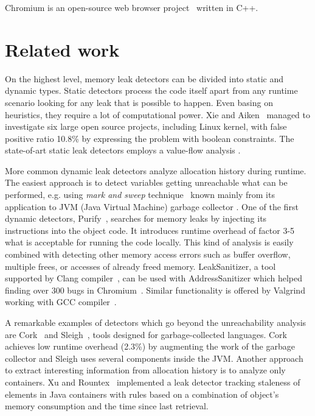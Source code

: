 \documentclass[preprint, numbers]{sigplanconf}
\newcommand{\comment}[1]{{\color{blue}{#1}}}
\newcommand{\todo}[1]{{\color{red}{(TODO: #1)}}}
\begin{document}
Chromium is an open-source web browser project~\cite{chromium} written in C++.
\comment{Should we write more about Chromium architecture,
its relation to Chrome, the market share?}

\section{Related work}

On the highest level, memory leak detectors can be divided into static
and dynamic types.
Static detectors process the code itself apart from any runtime scenario
looking for any leak that is possible to happen.
Even basing on heuristics, they require a lot of computational power.
Xie and Aiken~\cite{boolean} managed to investigate six large open source
projects, including Linux kernel, with false positive ratio 10.8\%
by expressing the problem with boolean constraints.
The state-of-art static leak detectors employs a value-flow
analysis \cite{flow, saber}.

More common dynamic leak detectors analyze allocation history during runtime.
The easiest approach is to detect variables getting unreachable
what can be performed, e.g. using \textit{mark and sweep} technique~\cite{mark-and-sweep}
known mainly from its application to JVM (Java Virtual Machine) garbage collector \todo{cite}.
One of the first dynamic detectors, Purify~\cite{purify}, searches for memory leaks by injecting its instructions
into the object code.
It introduces runtime overhead of factor 3-5 what is acceptable for running
the code locally.
This kind of analysis is easily combined with detecting other memory access errors
such as buffer overflow, multiple frees, or accesses of already freed memory.
LeakSanitizer, a tool supported by Clang compiler~\cite{leak-san}, can be used with AddressSanitizer
which helped finding over 300 bugs in Chromium~\cite{address}.
Similar functionality is offered by Valgrind working with GCC compiler~\cite{valgrind}.

A remarkable examples of detectors which go beyond the unreachability analysis
are Cork~\cite{cork} and Sleigh~\cite{sleigh}, tools designed for garbage-collected languages.
Cork achieves low runtime overhead (2.3\%) by augmenting the work of the garbage collector
and Sleigh uses several components inside the JVM.
Another approach to extract interesting information from allocation history
is to analyze only containers.
Xu and Rountex~\cite{containers} implemented a leak detector tracking staleness
of elements in Java containers with rules based on a combination of
object's memory consumption and the time since last retrieval.
\end{document}
